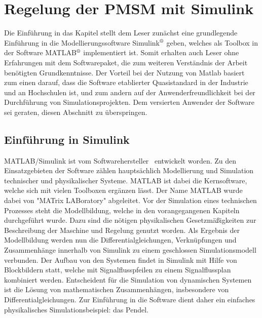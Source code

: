 
\chapter{Regelung der PMSM mit Simulink}
\label{cha:regelungpmsm}

Die Einführung in das Kapitel stellt dem Leser zunächst eine grundlegende Einführung in die Modellierungssoftware  Simulink$^\text{\textregistered}$ geben, welches als Toolbox in der Software MATLAB$^\text{\textregistered}$ implementiert ist.
Somit erhalten auch Leser ohne Erfahrungen mit dem Softwarepaket, die zum weiteren Verständnis der Arbeit benötigten Grundkenntnisse.
Der Vorteil bei der Nutzung von Matlab basiert zum einen darauf, dass die Software etablierter Quasistandard in der Industrie und an Hochschulen ist, und zum andern auf der Anwenderfreundlichkeit bei der Durchführung von Simulationsprojekten. \autocite[Vorwort]{scherf2010}
Dem versierten Anwender der Software sei geraten, diesen Abschnitt zu überspringen.


\section{Einführung in Simulink}\label{sec:simulink}

MATLAB/Simulink ist vom Softwarehersteller \grqq ~entwickelt worden. Zu den Einsatzgebieten der Software zählen hauptsächlich Modellierung und Simulation technischer und physikalischer Systeme. 
MATLAB ist dabei die Kernsoftware, welche sich mit vielen Toolboxen ergänzen lässt. 
Der Name MATLAB wurde dabei von "MATrix LABoratory" abgeleitet.
Vor der Simulation eines technischen Prozesses steht die Modellbildung, welche in den vorangegangenen Kapiteln durchgeführt wurde.
Dazu sind die nötigen physikalischen Gesetzmäßigkeiten zur Beschreibung der Maschine und Regelung genutzt worden.
Als Ergebnis der Modellbildung werden nun die Differentialgleichungen, Verknüpfungen und Zusammenhänge innerhalb von Simulink zu einem geschlossen Simulationsmodell verbunden. 
Der Aufbau von den Systemen findet in Simulink mit Hilfe von Blockbildern statt, welche mit Signalflusspfeilen zu einem Signalflussplan kombiniert werden. 
Entscheident für die Simulation von dynamischen Systemen ist die Lösung von mathematischen Zusammenhängen, insbesondere von Differentialgleichungen. 
Zur Einführung in die Software dient daher ein einfaches physikalisches Simulationsbeispiel: das Pendel.

